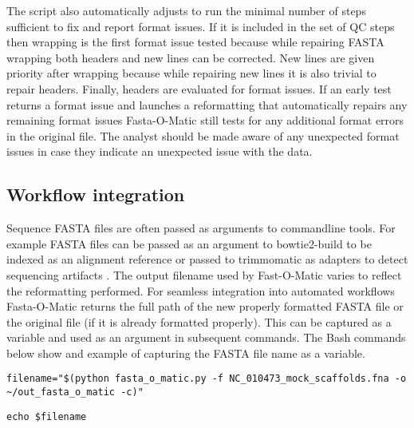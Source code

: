 The script also automatically adjusts to run the minimal number of steps sufficient to fix and report format issues. If it is included in the set of QC steps then wrapping is the first format issue tested because while repairing FASTA wrapping both headers and new lines can be corrected. New lines are given priority after wrapping because while repairing new lines it is also trivial to repair headers. Finally, headers are evaluated for format issues. If an early test returns a format issue and launches a reformatting that automatically repairs any remaining format issues Fasta-O-Matic still tests for any additional format errors in the original file. The analyst should be made aware of any unexpected format issues in case they indicate an unexpected issue with the data.
  
 \subsection{Workflow integration}
 
Sequence FASTA files are often passed as arguments to commandline tools. For example FASTA files can be passed as an argument to bowtie2-build to be indexed as an alignment reference \cite{langmead2012fast} or passed to trimmomatic as adapters to detect sequencing artifacts \cite{bolger2014trimmomatic}. The output filename used by Fast-O-Matic varies to reflect the reformatting performed. For seamless integration into automated workflows Fasta-O-Matic returns the full path of the new properly formatted FASTA file or the original file (if it is already formatted properly). This can be captured as a variable and used as an argument in subsequent commands. The Bash commands below show and example of capturing the FASTA file name as a variable.

\verb|filename="$(python fasta_o_matic.py -f NC_010473_mock_scaffolds.fna -o ~/out_fasta_o_matic -c)"|
  
\verb|echo $filename|
  
  
  